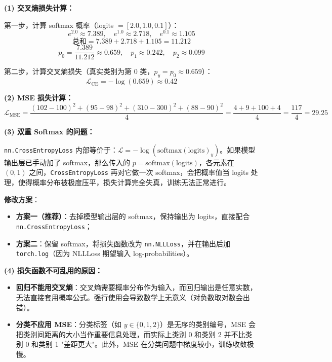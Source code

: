 \documentclass[a4paper,11pt]{ctexart}
\begin{document}
\begin{solutionbox}[参考答案与详细解析]
    \textbf{(1) 交叉熵损失计算：}

    第一步，计算 softmax 概率（logits $= [2.0, 1.0, 0.1]$）：
    \[
    e^{2.0} \approx 7.389,\quad e^{1.0} \approx 2.718,\quad e^{0.1} \approx 1.105
    \]
    \[
    \text{总和} = 7.389 + 2.718 + 1.105 = 11.212
    \]
    \[
    p_0 = \frac{7.389}{11.212} \approx 0.659,\quad p_1 \approx 0.242,\quad p_2 \approx 0.099
    \]

    第二步，计算交叉熵损失（真实类别为第 0 类，$p_y = p_0 \approx 0.659$）：
    \[
    \mathcal{L}_{\text{CE}} = -\log(0.659) \approx \boxed{0.42}
    \]

    \textbf{(2) MSE 损失计算：}
    \[
    \mathcal{L}_{\text{MSE}} = \frac{(102-100)^2 + (95-98)^2 + (310-300)^2 + (88-90)^2}{4}
    = \frac{4 + 9 + 100 + 4}{4} = \frac{117}{4} = \boxed{29.25}
    \]

    \textbf{(3) 双重 Softmax 的问题：}

    \texttt{nn.CrossEntropyLoss} 内部等价于：$\mathcal{L} = -\log\!\left(\text{softmax}(\text{logits})_y\right)$。如果模型输出层已手动加了 softmax，那么传入的 $p = \text{softmax}(\text{logits})$，各元素在 $(0,1)$ 之间，\texttt{CrossEntropyLoss} 再对它做一次 softmax，会把概率值当 logits 处理，使得概率分布被极度压平，损失计算完全失真，训练无法正常进行。

    \textbf{修改方案}：
    \begin{itemize}
        \item \textbf{方案一（推荐）}：去掉模型输出层的 softmax，保持输出为 logits，直接配合 \texttt{nn.CrossEntropyLoss}；
        \item \textbf{方案二}：保留 softmax，将损失函数改为 \texttt{nn.NLLLoss}，并在输出后加 \texttt{torch.log}（因为 NLLLoss 期望输入 log-probabilities）。
    \end{itemize}

    \textbf{(4) 损失函数不可乱用的原因：}

    \begin{itemize}
        \item \textbf{回归不能用交叉熵}：交叉熵需要概率分布作为输入，而回归输出是任意实数，无法直接套用概率公式。强行使用会导致数学上无意义（对负数取对数会出错）。
        \item \textbf{分类不应用 MSE}：分类标签（如 $y \in \{0,1,2\}$）是无序的类别编号，MSE 会把类别间距离的大小当作重要信息处理，而实际上类别 0 和类别 2 并不比类别 0 和类别 1 "差距更大"。此外，MSE 在分类问题中梯度较小，训练收敛极慢。
    \end{itemize}
\end{solutionbox}
\end{document}
